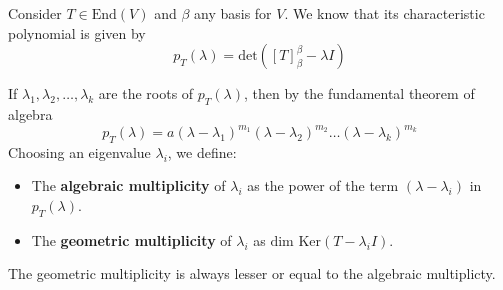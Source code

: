 \begin{definition}
	Consider $T \in \text{End}(V)$ and $\beta$ any basis for $V$. We know that its characteristic polynomial is given by
	\[ p_T(\lambda) = \text{det}([T]_\beta^{\beta} - \lambda I) \]

	If $\lambda_1, \lambda_2, \ldots, \lambda_k$ are the roots of $p_T(\lambda)$, then by the fundamental theorem of algebra
	\[
		p_T(\lambda) = a(\lambda - \lambda_1)^{m_1} (\lambda - \lambda_2)^{m_2} \ldots (\lambda - \lambda_k)^{m_k}
	\]
	Choosing an eigenvalue $\lambda_i$, we define:
	\begin{itemize}
		\item The \textbf{algebraic multiplicity} of $\lambda_i$ as the power of the term $(\lambda - \lambda_i)$ in $p_T(\lambda)$.
		\item The \textbf{geometric multiplicity} of $\lambda_i$ as $\text{dim Ker}(T - \lambda_i I)$.
	\end{itemize}
\end{definition}

\begin{remark}
	The geometric multiplicity is always lesser or equal to the algebraic multiplicty.
\end{remark}

